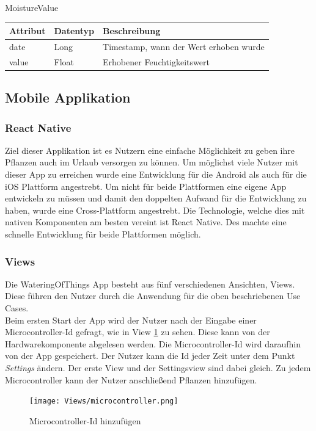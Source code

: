      \begin{minipage}{\textwidth}
        MoistureValue\\
        \begin{tabularx}{\linewidth}{|l|l|X|}
            \hline
            Attribut & Datentyp & Beschreibung\\
            \hline
            date & Long & Timestamp, wann der Wert erhoben wurde \\
            value & Float & Erhobener Feuchtigkeitswert \\
            \hline                              
        \end{tabularx}
    \end{minipage}
    
    \subsection{Mobile Applikation}

        \subsubsection{React Native}
Ziel dieser Applikation ist es Nutzern eine einfache Möglichkeit zu geben ihre Pflanzen auch im Urlaub versorgen zu können. Um möglichst viele Nutzer mit dieser App zu erreichen wurde eine Entwicklung für die Android als auch für die iOS Plattform angestrebt. Um nicht für beide Plattformen eine eigene App entwickeln zu müssen und damit den doppelten Aufwand für die Entwicklung zu haben, wurde eine Cross-Plattform angestrebt. Die Technologie, welche dies mit nativen Komponenten am besten vereint ist React Native. Des machte eine schnelle Entwicklung für beide Plattformen möglich. 
        
        \subsubsection{Views}\label{views}
Die WateringOfThings App besteht aus fünf verschiedenen Ansichten, Views. Diese führen den Nutzer durch die Anwendung für die oben beschriebenen Use Cases. \\

Beim ersten Start der App wird der Nutzer nach der Eingabe einer Microcontroller-Id gefragt, wie in View \ref{microcontroller} zu sehen. Diese kann von der Hardwarekomponente abgelesen werden. Die Microcontroller-Id wird daraufhin von der App gespeichert. Der Nutzer kann die Id jeder Zeit unter dem Punkt \textit{Settings} ändern. Der erste View und der Settingsview sind dabei gleich. Zu jedem Microcontroller kann der Nutzer anschließend Pflanzen hinzufügen.  
\begin{figure}[H]
    \centering
    \texttt{[image: Views/microcontroller.png]}
    \caption{Microcontroller-Id hinzufügen}
    \label{microcontroller}
\end{figure}

